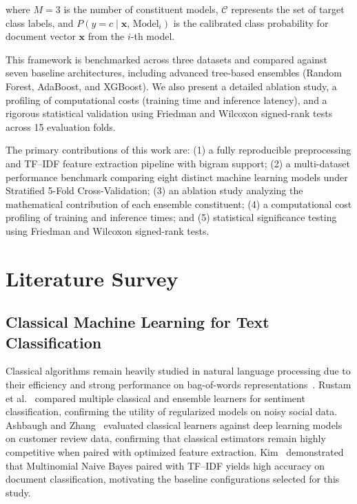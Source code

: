 \documentclass[conference]{IEEEtran}
\begin{document}
\noindent where $M = 3$ is the number of constituent models, $\mathcal{C}$ represents the set of target class labels, and $P\!\left(y = c \mid \mathbf{x},\, \text{Model}_i\right)$ is the calibrated class probability for document vector $\mathbf{x}$ from the $i$-th model.

This framework is benchmarked across three datasets and compared against seven baseline architectures, including advanced tree-based ensembles (Random Forest, AdaBoost, and XGBoost). We also present a detailed ablation study, a profiling of computational costs (training time and inference latency), and a rigorous statistical validation using Friedman and Wilcoxon signed-rank tests across 15 evaluation folds.

The primary contributions of this work are: (1) a fully reproducible preprocessing and TF--IDF feature extraction pipeline with bigram support; (2) a multi-dataset performance benchmark comparing eight distinct machine learning models under Stratified 5-Fold Cross-Validation; (3) an ablation study analyzing the mathematical contribution of each ensemble constituent; (4) a computational cost profiling of training and inference times; and (5) statistical significance testing using Friedman and Wilcoxon signed-rank tests.

\section{Literature Survey}

\subsection{Classical Machine Learning for Text Classification}
Classical algorithms remain heavily studied in natural language processing due to their efficiency and strong performance on bag-of-words representations~\cite{ref3,ref10}. Rustam et al.~\cite{ref2} compared multiple classical and ensemble learners for sentiment classification, confirming the utility of regularized models on noisy social data. Ashbaugh and Zhang~\cite{ref3} evaluated classical learners against deep learning models on customer review data, confirming that classical estimators remain highly competitive when paired with optimized feature extraction. Kim~\cite{ref10} demonstrated that Multinomial Naive Bayes paired with TF--IDF yields high accuracy on document classification, motivating the baseline configurations selected for this study.
\end{document}
